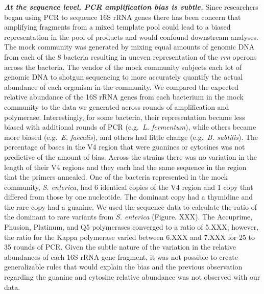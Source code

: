 \documentclass[11pt,]{article}
\begin{document}
\textbf{\emph{At the sequence level, PCR amplification bias is subtle.}}
Since researchers began using PCR to sequence 16S rRNA genes there has
been concern that amplifying fragments from a mixed template pool could
lead to a biased representation in the pool of products and would
confound downstream analyses. The mock community was generated by mixing
equal amounts of genomic DNA from each of the 8 bacteria resulting in
uneven representation of the \emph{rrn} operons across the bacteria. The
vendor of the mock community subjects each lot of genomic DNA to shotgun
sequencing to more accurately quantify the actual abundance of each
organism in the community. We compared the expected relative abundance
of the 16S rRNA genes from each bacterium in the mock community to the
data we generated across rounds of amplification and polymerase.
Interestingly, for some bacteria, their representation became less
biased with additional rounds of PCR (e.g.~\emph{L. fermentum}), while
others became more biased (e.g.~\emph{E. faecalis}), and others had
little change (e.g.~\emph{B. subtilis}). The percentage of bases in the
V4 region that were guanines or cytosines was not predictive of the
amount of bias. Across the strains there was no variation in the length
of their V4 regions and they each had the same sequence in the region
that the primers annealed. One of the bacteria represented in the mock
community, \emph{S. enterica}, had 6 identical copies of the V4 region
and 1 copy that differed from those by one nucleotide. The dominant copy
had a thymidine and the rare copy had a guanine. We used the sequence
data to calculate the ratio of the dominant to rare variants from
\emph{S. enterica} (Figure. XXX). The Accuprime, Phusion, Platinum, and
Q5 polymerases converged to a ratio of 5.XXX; however, the ratio for the
Kappa polymerase varied between 6.XXX and 7.XXX for 25 to 35 rounds of
PCR. Given the subtle nature of the variation in the relative abundances
of each 16S rRNA gene fragment, it was not possible to create
generalizable rules that would explain the bias and the previous
observation regarding the guanine and cytosine relative abundance was
not observed with our data.
\end{document}
